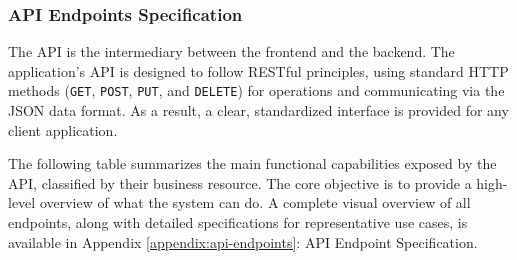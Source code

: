 \subsubsection{API Endpoints Specification}

The API is the intermediary between the frontend and the backend. The application's API is designed to follow RESTful principles, using standard HTTP methods (\texttt{GET}, \texttt{POST}, \texttt{PUT}, and \texttt{DELETE}) for operations and communicating via the JSON data format. As a result, a clear, standardized interface is provided for any client application.

The following table summarizes the main functional capabilities exposed by the API, classified by their business resource. The core objective is to provide a high-level overview of what the system can do. A complete visual overview of all endpoints, along with detailed specifications for representative use cases, is available in Appendix \ref{appendix:api-endpoints}: API Endpoint Specification.

